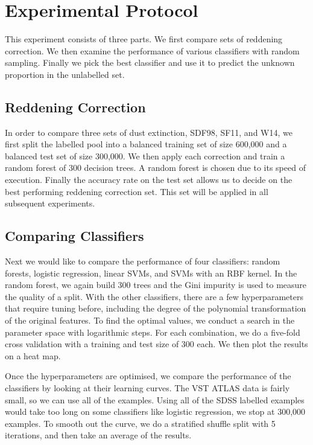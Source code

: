 \section{Experimental Protocol}
\label{sec:protocol1}

This experiment consists of three parts. We first compare sets of reddening correction.
We then examine the performance of various classifiers with random sampling. Finally
we pick the best classifier and use it to predict the unknown proportion in the unlabelled
set.

\subsection{Reddening Correction}
In order to compare three sets of dust extinction, SDF98, SF11, and W14, we first
split the labelled pool into a balanced training set of size 600,000 and a balanced test
set of size 300,000. We then apply each correction and train a random forest of 300 decision
trees. A random forest is chosen due to its speed of execution. Finally the accuracy rate on the test set allows
us to decide on the best performing reddening correction set. This set will be applied
in all subsequent experiments.

\subsection{Comparing Classifiers}
Next we would like to compare the performance of four classifiers: random forests, logistic
regression, linear SVMs, and SVMs with an RBF kernel. In the random forest,
we again build 300 trees and the
Gini impurity is used to measure the quality of a split. With the other classifiers,
there
are a few hyperparameters that require tuning before, including the degree of the polynomial
transformation of the original features. To find the optimal values,
we conduct a search in the parameter space with logarithmic steps. For each combination,
we do a five-fold cross validation with a training and test size of 300 each. We then plot
the results on a heat map.

Once the hyperparameters are optimised, we compare the performance of the classifiers by looking
at their learning curves. The VST ATLAS data is fairly small, so we can use all of the examples.
Using all of the SDSS labelled examples would take too long on some classifiers like
logistic regression, we stop at 300,000 examples. To smooth out the curve, we do a
stratified shuffle split with 5 iterations, and then take an average of the results.

